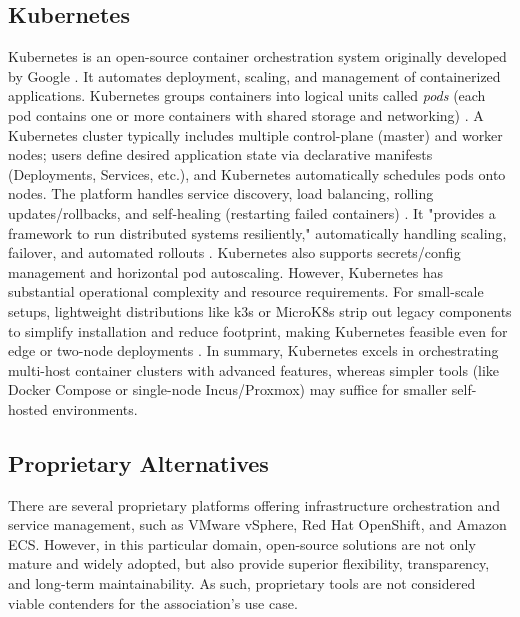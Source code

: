 \subsection{Kubernetes}

Kubernetes is an open-source container orchestration system originally developed by Google \cite{KubernetesHome2023}. It automates deployment, scaling, and management of containerized applications. Kubernetes groups containers into logical units called \emph{pods} (each pod contains one or more containers with shared storage and networking) \cite{KubernetesHome2023}\cite{KubernetesPods2025}. A Kubernetes cluster typically includes multiple control-plane (master) and worker nodes; users define desired application state via declarative manifests (Deployments, Services, etc.), and Kubernetes automatically schedules pods onto nodes. The platform handles service discovery, load balancing, rolling updates/rollbacks, and self-healing (restarting failed containers) \cite{KubernetesDocs2025}. It "provides a framework to run distributed systems resiliently," automatically handling scaling, failover, and automated rollouts \cite{KubernetesDocs2025}. Kubernetes also supports secrets/config management and horizontal pod autoscaling. However, Kubernetes has substantial operational complexity and resource requirements. For small-scale setups, lightweight distributions like k3s or MicroK8s strip out legacy components to simplify installation and reduce footprint, making Kubernetes feasible even for edge or two-node deployments \cite{K3sMicroK8s2022}. In summary, Kubernetes excels in orchestrating multi-host container clusters with advanced features, whereas simpler tools (like Docker Compose or single-node Incus/Proxmox) may suffice for smaller self-hosted environments.

\subsection{Proprietary Alternatives}

There are several proprietary platforms offering infrastructure orchestration and service management, such as VMware vSphere, Red Hat OpenShift, and Amazon ECS. However, in this particular domain, open-source solutions are not only mature and widely adopted, but also provide superior flexibility, transparency, and long-term maintainability. As such, proprietary tools are not considered viable contenders for the association's use case.
